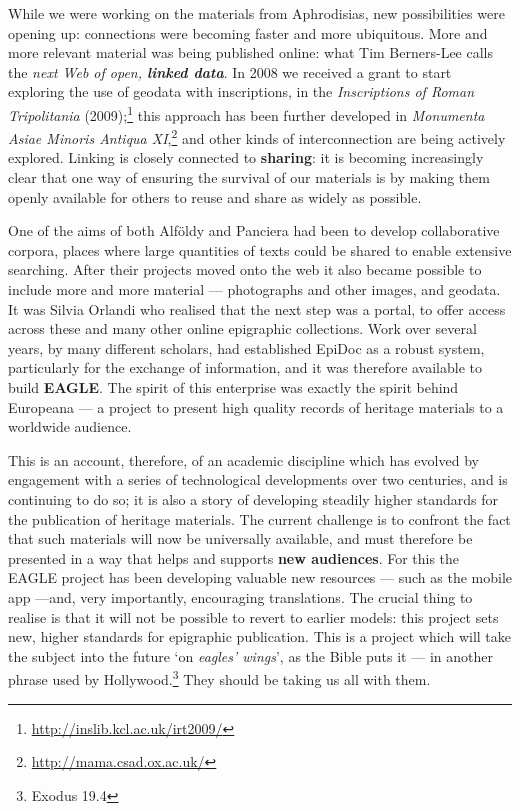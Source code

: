 \documentclass[amsthm,ebook]{saparticle}
\begin{document}
While we were working on the materials from Aphrodisias, new possibilities were opening up: connections were becoming
faster and more ubiquitous. More and more relevant material was being published online: what Tim Berners-Lee calls the
\emph{next Web of open, \textbf{linked data}}. In 2008 we received a grant to start exploring the use of geodata with inscriptions, in
the\emph{ Inscriptions of Roman Tripolitania} (2009);\footnote{ \url{http://inslib.kcl.ac.uk/irt2009/}} this approach has been
further developed in \emph{Monumenta Asiae Minoris Antiqua XI},\footnote{ \url{http://mama.csad.ox.ac.uk/}}  and other kinds of
interconnection are being actively explored. Linking is closely connected to \textbf{sharing}: it is becoming increasingly clear
that one way of ensuring the survival of our materials is by making them openly available for others to reuse and share
as widely as possible.


One of the aims of both Alföldy and Panciera had been to develop collaborative corpora, places where large quantities of
texts could be shared to enable extensive searching. After their projects moved onto the web it also became possible to
include more and more material --- photographs and other images, and geodata. It was Silvia Orlandi who realised that the
next step was a portal, to offer access across these and many other online epigraphic collections. Work over several
years, by many different scholars, had established EpiDoc as a robust system, particularly for the exchange of
information, and it was therefore available to build \textbf{EAGLE}. The spirit of this enterprise was exactly the spirit behind
Europeana --- a project to present high quality records of heritage materials to a worldwide audience. 


This is an account, therefore, of an academic discipline which has evolved by engagement with a series of technological
developments over two centuries, and is continuing to do so; it is also a story of developing steadily higher standards
for the publication of heritage materials. The current challenge is to confront the fact that such materials will now
be universally available, and must therefore be presented in a way that helps and supports \textbf{new audiences}. For this the
EAGLE project has been developing valuable new resources --- such as the mobile app ---and, very importantly, encouraging
translations. The crucial thing to realise is that it will not be possible to revert to earlier models: this project
sets new, higher standards for epigraphic publication. This is a project which will take the subject into the future
`on \emph{eagles' wings}', as the Bible puts it --- in another phrase used by Hollywood.\footnote{ Exodus 19.4} They
should be taking us all with them.




\end{document}
